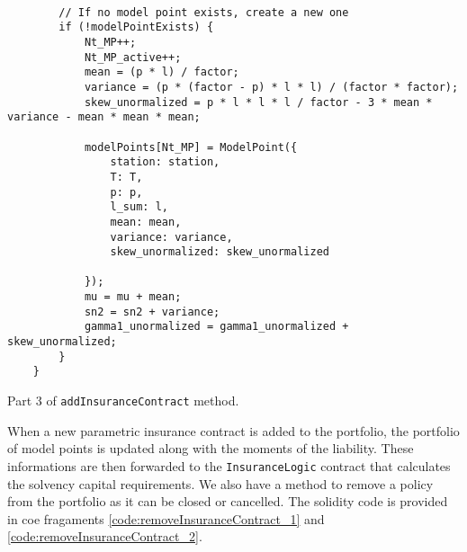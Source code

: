 \documentclass[10pt]{article}
\begin{document}
\begin{codefragment}[!h]
\begin{lstlisting}[language=Solidity]

        // If no model point exists, create a new one
        if (!modelPointExists) {
            Nt_MP++;
            Nt_MP_active++;
            mean = (p * l) / factor;
            variance = (p * (factor - p) * l * l) / (factor * factor);
            skew_unormalized = p * l * l * l / factor - 3 * mean * variance - mean * mean * mean;
            
            modelPoints[Nt_MP] = ModelPoint({
                station: station,
                T: T,
                p: p,
                l_sum: l, 
                mean: mean,
                variance: variance,
                skew_unormalized: skew_unormalized
            
            });
            mu = mu + mean;
            sn2 = sn2 + variance;
            gamma1_unormalized = gamma1_unormalized + skew_unormalized;
        }
    }

        \end{lstlisting}
    \caption{Part 3 of \texttt{addInsuranceContract} method.}
    \label{code:addInsuranceContract_3}
\end{codefragment}

When a new parametric insurance contract is added to the portfolio, the portfolio of model points is updated along with the moments of the liability. These informations are then forwarded to the \texttt{InsuranceLogic} contract that calculates the solvency capital requirements. We also have a method to remove a policy from the portfolio as it can be closed or cancelled. The solidity code is provided in coe fragaments \ref{code:removeInsuranceContract_1} and \ref{code:removeInsuranceContract_2}.
\end{document}
